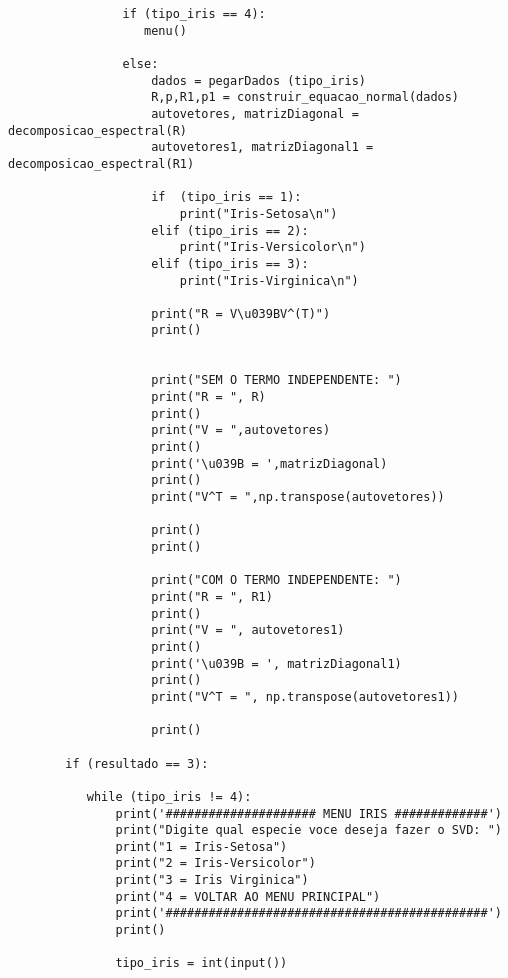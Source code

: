 \documentclass[a4paper,12pt,twoside]{article}
\begin{document}
\begin{lstlisting}
                if (tipo_iris == 4):
                   menu()
                   
                else:
                    dados = pegarDados (tipo_iris)
                    R,p,R1,p1 = construir_equacao_normal(dados)
                    autovetores, matrizDiagonal = decomposicao_espectral(R)
                    autovetores1, matrizDiagonal1 = decomposicao_espectral(R1)
                    
                    if  (tipo_iris == 1):
                        print("Iris-Setosa\n")
                    elif (tipo_iris == 2):
                        print("Iris-Versicolor\n")
                    elif (tipo_iris == 3):
                        print("Iris-Virginica\n")
                    
                    print("R = V\u039BV^(T)")
                    print()
                    
                    
                    print("SEM O TERMO INDEPENDENTE: ")
                    print("R = ", R)
                    print()
                    print("V = ",autovetores)
                    print()
                    print('\u039B = ',matrizDiagonal)
                    print()
                    print("V^T = ",np.transpose(autovetores))
                    
                    print()
                    print()
                    
                    print("COM O TERMO INDEPENDENTE: ")
                    print("R = ", R1)
                    print()
                    print("V = ", autovetores1)
                    print()
                    print('\u039B = ', matrizDiagonal1)
                    print()
                    print("V^T = ", np.transpose(autovetores1))
                    
                    print()
        
        if (resultado == 3):
             
           while (tipo_iris != 4):
               print('##################### MENU IRIS #############')
               print("Digite qual especie voce deseja fazer o SVD: ")
               print("1 = Iris-Setosa")
               print("2 = Iris-Versicolor")
               print("3 = Iris Virginica")
               print("4 = VOLTAR AO MENU PRINCIPAL")
               print('#############################################')
               print()
             
               tipo_iris = int(input())
              

\end{lstlisting}
\end{document}
